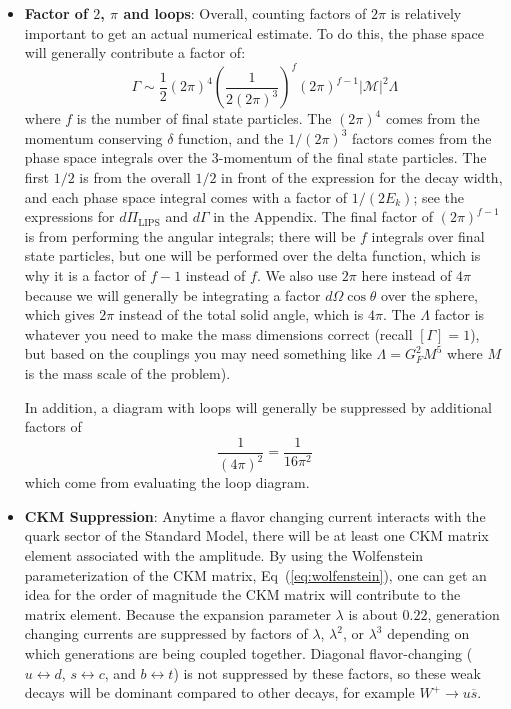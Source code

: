 \documentclass[11pt, oneside]{article}   	%
\theoremstyle{definition}
\numberwithin{equation}{subsection}		%
\begin{document}
\begin{itemize}
\item \textbf{Factor of $2$, $\pi$ and loops}: Overall, counting factors of $2\pi$ is relatively important to get an actual numerical estimate. 
To do this, the phase space will generally contribute a factor of:
\begin{equation}
	\Gamma\sim \frac{1}{2}(2\pi)^4 \left(\frac{1}{2 (2\pi)^3}\right)^{f} (2\pi)^{f - 1} |\mathcal M|^2 \Lambda
\end{equation}
where $f$ is the number of final state particles. The $(2\pi)^4$ comes from the momentum conserving $\delta$ function, and the 
$1 / (2\pi)^3$ factors comes from the phase space integrals over the 3-momentum of the final state particles. The first $1/2$ is from the 
overall $1/2$ in front of the expression for the decay width, and each phase space integral comes with a factor of $1 / (2 E_k)$; see 
the expressions for $d\Pi_\mathrm{LIPS}$ and $d\Gamma$ in the Appendix. The final factor of $(2\pi)^{f - 1}$ is from performing the 
angular integrals; there will be $f$ integrals over final state particles, but one will be performed over the delta function, which is why 
it is a factor of $f - 1$ instead of $f$. We also use $2\pi$ here instead of $4\pi$ because we will generally be integrating a factor 
$d\Omega\cos\theta$ over the sphere, which gives $2\pi$ instead of the total solid angle, which is $4\pi$. 
The $\Lambda$ factor is whatever you need to make the mass 
dimensions correct (recall $[\Gamma] = 1$), but based on the couplings you may need something like $\Lambda = G_F^2 M^5$ where 
$M$ is the mass scale of the problem). 

In addition, a diagram with loops will generally be suppressed by additional factors of 
\begin{equation}
	\frac{1}{(4\pi)^2} = \frac{1}{16\pi^2}
\end{equation}
which come from evaluating the loop diagram. 

\item \textbf{CKM Suppression}: Anytime a flavor changing current interacts with the quark sector of the Standard Model, there will be at 
least one CKM matrix element associated with the amplitude. By using the Wolfenstein parameterization of the CKM matrix, Eq~(\ref{eq:wolfenstein}), 
one can get an idea for the order of magnitude the CKM matrix will contribute to the matrix element. Because the expansion parameter $\lambda$ is about 
$0.22$, generation changing currents are suppressed by factors of $\lambda$, $\lambda^2$, or $\lambda^3$ depending on which generations 
are being coupled together. Diagonal flavor-changing ($u\leftrightarrow d$, $s\leftrightarrow c$, and $b\leftrightarrow t$) is not suppressed by these 
factors, so these weak decays will be dominant compared to other decays, for example $W^+\rightarrow u\overline s$. 


\end{itemize}
\end{document}
